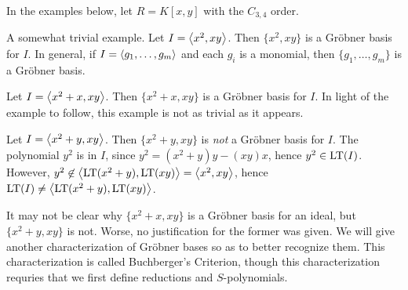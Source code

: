 In the examples below, let $R = K[x,y]$ with the $C_{3,4}$ order.
\begin{example}
  \label{ex_groebner_1}
  A somewhat trivial example. Let $I = \left\langle x^2, xy \right\rangle$.
  Then $\{x^2, xy\}$ is a Gr\"obner basis for $I$.
  In general, if $I = \left\langle g_1, \ldots, g_m \right\rangle$ and each $g_i$ is a monomial,
  then $\{g_1, \ldots, g_m\}$ is a Gr\"obner basis.
\end{example}
\begin{example}
  \label{ex_groebner_2}
  Let $I = \left\langle x^2 + x, xy \right\rangle$.
  Then $\{x^2 + x, xy\}$ is a Gr\"obner basis for $I$.
  In light of the example to follow, this example is not as trivial as it appears.
\end{example}
\begin{example}
  \label{ex_groebner_3}
  Let $I = \left\langle x^2 + y, xy \right\rangle$.
  Then $\{x^2 + y, xy\}$ is \emph{not} a Gr\"obner basis for $I$.
  The polynomial $y^2$ is in $I$, since $y^2 = (x^2 + y)y - (xy)x$, hence $y^2 \in \operatorname{LT}(I)$.
  However, $y^2 \not\in \left\langle  \operatorname{LT}(x^2 + y), \operatorname{LT}(xy)  \right\rangle = \left\langle x^2, xy \right\rangle$,
  hence $\operatorname{LT}(I) \neq \left\langle  \operatorname{LT}(x^2 + y), \operatorname{LT}(xy)  \right\rangle$.
\end{example}

It may not be clear why $\{x^2 + x, xy\}$ is a Gr\"obner basis for an ideal, but $\{x^2 + y, xy\}$ is not.
Worse, no justification for the former was given.
We will give another characterization of Gr\"obner bases so as to better recognize them.
This characterization is called Buchberger's Criterion,
though this characterization requries that we first define reductions and $S$-polynomials.

